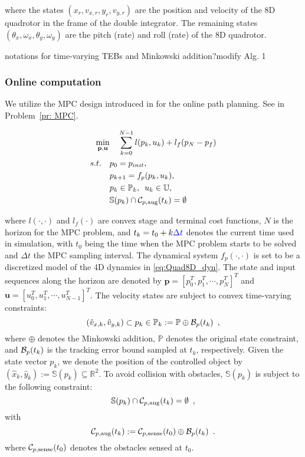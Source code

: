 where the states $(x_r,v_{x,r},y_r,v_{y,r})$ are the position and velocity of the 8D quadrotor in the frame of the double integrator. The remaining states $(\theta_x,\omega_x,\theta_y,\omega_y)$ are the pitch (rate) and roll (rate) of the 8D quadrotor.

\color{blue} notations for time-varying TEBs and Minkowski addition?modify Alg. 1\color{black}

\subsubsection{Online computation}
%
We utilize the MPC design introduced in \cite{Zhang2017} for the online path planning. See in Problem~\ref{pr: MPC}.
%
\begin{problem}\label{pr: MPC}
\begin{align*}
\min_{\mathbf{p},\mathbf{u}}  & \quad \sum^{N-1}_{k=0} l(p_k,u_k) + l_f(p_N-p_f)  \\
s.t. \quad & p_0 = p_{init},\\
&p_{k+1} = f_p(p_k,u_k),\\
& p_k \in \mathbb{P}_k ,\enspace u_k \in \mathbb{U},\\
& \mathbb{S}(p_k)\cap\mathcal C_{p,\text{aug}}(t_k) = \emptyset
\end{align*}
\end{problem}
where $l(\cdot,\cdot)$ and $l_f(\cdot)$ are convex stage and terminal cost functions, $N$ is the horizon for the MPC problem, and $t_k = t_0 + k \textcolor{blue}{\Delta t}$ denotes the current time used in simulation, with $t_0$ being the time when the MPC problem starts to be solved and $\Delta t$ the MPC sampling interval. The dynamical system $f_p(\cdot,\cdot)$ is set to be a discretized model of the 4D dynamics in \eqref{eq:Quad8D_dyn}. The state and input sequences along the horizon  are denoted by $\mathbf{p}=[p^{T}_0,p^{T}_1,\cdots,p^{T}_N]^{T}$ and $\mathbf{u}=[u^{T}_0,u^{T}_1,\cdots,u^{T}_{N-1}]^{T}$. The velocity states are subject to convex time-varying constraints:
%
\begin{equation}
(\hat v_{x,k},\hat v_{y,k}) \subset p_k \in \mathbb{P}_k :=\mathbb{P}\oplus\mathcal B_p(t_k) \enspace ,
\end{equation}
%
where $\oplus$ denotes the Minkowski addition, $\mathbb{P}$ denotes the original state constraint, and $\mathcal B_p(t_k)$ is the tracking error bound sampled at $t_k$, respectively. Given the state vector $p_k$, we denote the position of the controlled object by $(\hat x_k,\hat y_k) := \mathbb{S}(p_k)\subseteq \mathbb{R}^{2}$. To avoid collision with obstacles, $\mathbb{S}(p_k)$ is subject to the following constraint: 
%
\begin{equation}
\mathbb{S}(p_k)\cap\mathcal C_{p,\text{aug}}(t_k) = \emptyset \enspace ,
\end{equation}
%
with 
%
\begin{equation}
\mathcal C_{p,\text{aug}}(t_k) := \mathcal C_{p,\text{sense}}(t_0)\oplus\mathcal B_p(t_k) \enspace .
\end{equation}
%
where $\mathcal C_{p,\text{sense}}(t_0)$ denotes the obstacles sensed at $t_0$.

